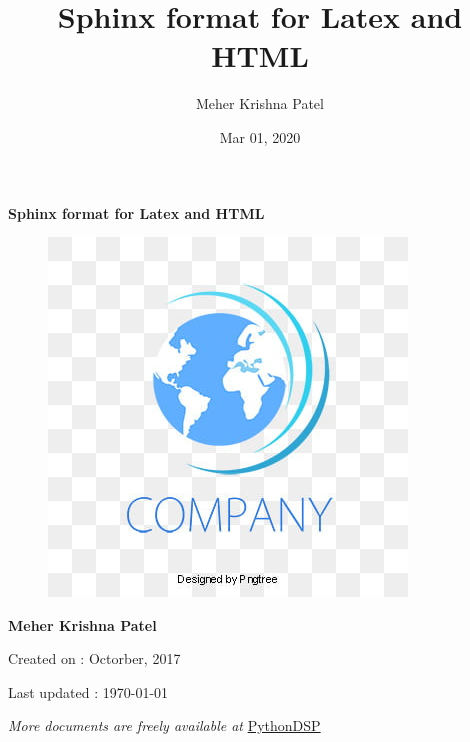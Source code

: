 \documentclass[a4paper,10pt,english]{report}
\title{Sphinx format for Latex and HTML}
\date{Mar 01, 2020}
\author{Meher Krishna Patel}
\begin{document}
\pagestyle{empty}

		
		\begin{titlepage}
			\centering
			
			\vspace*{40mm} %
			\textbf{\Huge {Sphinx format for Latex and HTML}}
			
			\vspace{0mm}
			\begin{figure}[!h]
				\centering
				\includegraphics[scale=0.3]{logo.jpg}
			\end{figure}
			
			\vspace{0mm}
			\Large \textbf{{Meher Krishna Patel}}
			
			\small Created on : Octorber, 2017
			
			\vspace*{0mm}
			\small Last updated : \MonthYearFormat\today
			
			
			\vfill
			\small \textit{More documents are freely available at }{\href{http://pythondsp.readthedocs.io/en/latest/pythondsp/toc.html}{PythonDSP}}
		\end{titlepage}
		
		\clearpage
		\tableofcontents
		\listoffigures
		\listoftables
		\clearpage
		
		
\pagestyle{plain}
 
\pagestyle{normal}
\label{\detokenize{index::doc}}
\end{document}
